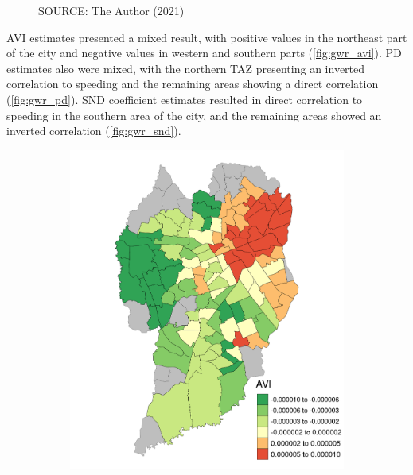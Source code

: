 \begin{figure}[!htbp]
\begin{subfigure}{0.5\textwidth}
    \end{subfigure}    
    \label{fig:gwr_dsc}
    \par SOURCE: The Author (2021)
\end{figure}

AVI estimates presented a mixed result, with positive values in the northeast part of the city and negative values in western and southern parts (\autoref{fig:gwr_avi}). PD estimates also were mixed, with the northern TAZ presenting an inverted correlation to speeding and the remaining areas showing a direct correlation (\autoref{fig:gwr_pd}). SND coefficient estimates resulted in direct correlation to speeding in the southern area of the city, and the remaining areas showed an inverted correlation (\autoref{fig:gwr_snd}).

\begin{figure}[!htbp]
    \centering\footnotesize
    \captionsetup{font=footnotesize}
    \caption{AVI COEFFICIENT ESTIMATES}
    \begin{subfigure}{0.5\textwidth}
        \includegraphics{fig/AVI.png}
    \end{subfigure}%
    \begin{subfigure}{0.5\textwidth}

\end{subfigure}
\end{figure}
